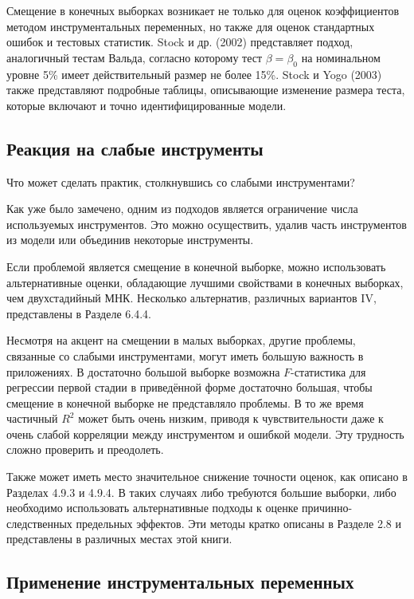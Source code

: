 Смещение в конечных выборках возникает не только для оценок коэффициентов методом инструментальных переменных, но также для оценок стандартных ошибок и тестовых статистик. Stock и др. (2002) представляет подход, аналогичный тестам Вальда, согласно которому тест $\beta = \beta_0$ на номинальном уровне 5\% имеет действительный размер не более 15\%. Stock и Yogo (2003) также представляют подробные таблицы, описывающие изменение размера теста, которые включают и точно идентифицированные модели. 

\subsection{Реакция на слабые инструменты}

Что может сделать практик, столкнувшись со слабыми инструментами?

Как уже было замечено, одним из подходов является ограничение числа используемых инструментов. Это можно осуществить, удалив часть инструментов из модели или объединив некоторые инструменты.

Если проблемой является смещение в конечной выборке, можно использовать альтернативные оценки, обладающие лучшими свойствами в конечных выборках, чем двухстадийный МНК. Несколько альтернатив, различных вариантов IV, представлены в Разделе 6.4.4.

Несмотря на акцент на смещении в малых выборках, другие проблемы, связанные со слабыми инструментами, могут иметь большую важность в приложениях. В достаточно большой выборке возможна $F$-статистика для регрессии первой стадии в приведённой форме достаточно большая, чтобы смещение в конечной выборке не представляло проблемы. В то же время частичный $R^2$ может быть очень низким, приводя к чувствительности даже к очень слабой корреляции между инструментом и ошибкой модели. Эту трудность сложно проверить и преодолеть.

Также может иметь место значительное снижение точности оценок, как описано в Разделах 4.9.3 и 4.9.4. В таких случаях либо требуются большие выборки, либо необходимо использовать альтернативные подходы к оценке причинно-следственных предельных эффектов. Эти методы кратко описаны в Разделе 2.8 и представлены в различных местах этой книги.

\subsection{Применение инструментальных переменных}


